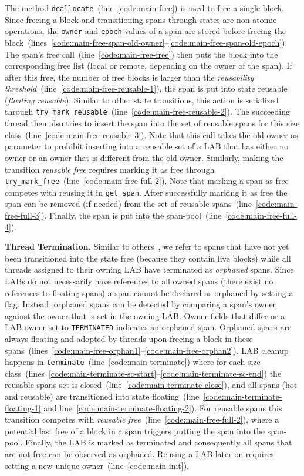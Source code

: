 \documentclass[10pt]{sigplanconf}
\newcommand{\OurSubsubsection}[1]{\smallbreak\noindent\textbf{#1}\xspace}
\newcommand{\lineRef}[1]{line~\ref{code:#1}}
\newcommand{\lineRangeRef}[2]{lines~\mbox{\ref{code:#1}--\ref{code:#2}}}
\newcommand{\impl}[1]{{\tt #1}\xspace}
\newcommand{\trans}[2]{{\it #1}  {\it #2}}
\begin{document}
The method \impl{deallocate}~(\lineRef{main-free}) is used to free a single
block. Since freeing a block and transitioning spans through states are
non-atomic operations, the \impl{owner} and \impl{epoch} values of a span are
stored before freeing the
block~(\lineRangeRef{main-free-span-old-owner}{main-free-span-old-epoch}). The
span's free call~(\lineRef{main-free-free}) then puts the block into the
corresponding free list (local or remote, depending on the owner of the span).
If after this free, the number of free blocks is larger than the
\emph{reusability threshold}~(\lineRef{main-free-reusable-1}), the span is put
into state reusable (\trans{floating}{reusable}). Similar to other state
transitions, this action is serialized through
\impl{try\_mark\_reusable}~(\lineRef{main-free-reusable-2}). The succeeding
thread then also tries to insert the span into the set of reusable spans for
this size class~(\lineRef{main-free-reusable-3}). Note that this call takes the
old owner as parameter to prohibit inserting into a reusable set of a LAB that
has either no owner or an owner that is different from the old owner. Similarly,
making the transition
\trans{reusable}{free} requires marking it as free through
\impl{try\_mark\_free}~(\lineRef{main-free-full-2}). Note that marking a span as
free competes with reusing it in \impl{get\_span}. After successfully
marking it as free the span can be removed (if needed) from the set of reusable
spans~(\lineRef{main-free-full-3}). Finally, the span is put into the
span-pool~(\lineRef{main-free-full-4}).

\OurSubsubsection{Thread Termination.}
Similar to others~\cite{Hudson:ISMM06}, we refer to spans that have not yet been
transitioned into the state free (because they contain live blocks) while all
threads assigned to their owning LAB have terminated as \emph{orphaned} spans.
Since LABs do not necessarily have references to all owned spans (there exist no
references to floating spans) a span cannot be declared as orphaned by setting a
flag. Instead, orphaned spans can be detected by comparing a span's owner against
the owner that is set in the owning LAB. Owner fields that differ or a LAB owner
set to \impl{TERMINATED} indicates an orphaned span. Orphaned spans are always
floating and adopted by threads upon freeing a block in these
spans~(\lineRangeRef{main-free-orphan1}{main-free-orphan2}). LAB cleanup happens
in \impl{terminate}~(\lineRef{main-terminate}) where for each size
class~(\lineRangeRef{main-terminate-sc-start}{main-terminate-sc-end}) the
reusable spans set is closed~(\lineRef{main-terminate-close}), and all spans
(hot and reusable) are transitioned into state
floating~(\lineRef{main-terminate-floating-1} and
\lineRef{main-terminate-floating-2}). For reusable spans this transition
competes with \trans{reusable}{free}~(\lineRef{main-free-full-2}), where a
potential last free of a block in a span triggers putting the span into the
span-pool. Finally, the LAB is marked as terminated and consequently all spans
that are not free can be observed as orphaned. Reusing a LAB later on requires
setting a new unique owner~(\lineRef{main-init}).
\end{document}
